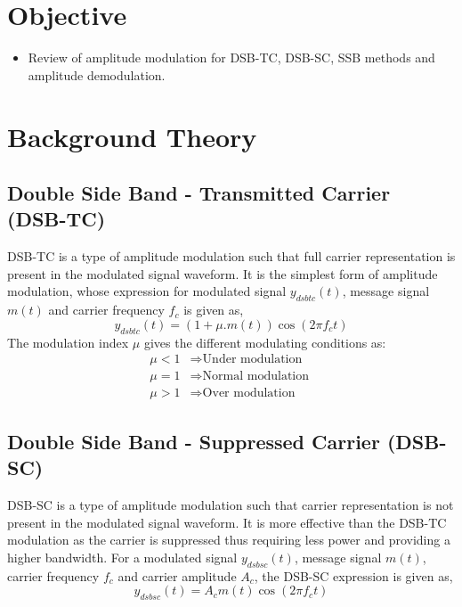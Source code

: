 \documentclass{lab_sheet}
\begin{document}
    \tableofcontents
    \clearpage
    \listoffigures
    \clearpage
    \lstlistoflistings
    \clearpage
\section{Objective}
\begin{itemize}
    \item Review of amplitude modulation for DSB-TC, DSB-SC, SSB methods and amplitude demodulation.
\end{itemize}

\section{Background Theory}
\subsection{Double Side Band - Transmitted Carrier (DSB-TC)}
DSB-TC is a type of amplitude modulation such that full carrier representation is present in the modulated signal waveform. It is the simplest form of amplitude modulation, whose expression for modulated signal $y_{dsbtc}(t)$, message signal $m(t)$ and carrier frequency $f_c$ is given as,
\begin{equation}
    y_{dsbtc}(t)=(1+\mu.m(t))\cos(2\pi f_c t)
\end{equation}
The modulation index $\mu$ gives the different modulating conditions as:
\begin{equation*}
    \begin{aligned}
    \mu < 1 &\Rightarrow \text{Under modulation }\\
    \mu = 1 &\Rightarrow \text{Normal modulation }\\
    \mu > 1 &\Rightarrow \text{Over modulation }
    \end{aligned}
\end{equation*}
\subsection{Double Side Band - Suppressed Carrier (DSB-SC)}
DSB-SC is a type of amplitude modulation such that carrier representation is not present in the modulated signal waveform. It is more effective than the DSB-TC modulation as the carrier is suppressed thus requiring less power and providing a higher bandwidth. For a modulated signal $y_{dsbsc}(t)$, message signal $m(t)$, carrier frequency $f_c$ and carrier amplitude $A_c$, the DSB-SC expression is given as,
\begin{equation}
    y_{dsbsc}(t)=A_cm(t)\cos(2\pi f_c t)
\end{equation}
\end{document}
